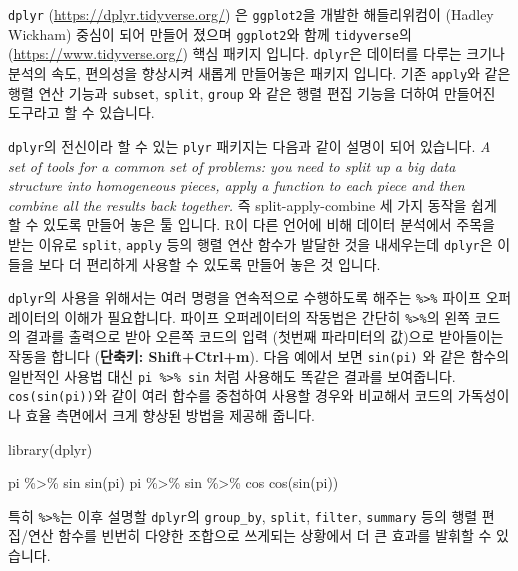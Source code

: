 \documentclass[
]{book}
\newenvironment{Shaded}{\begin{snugshade}}{\end{snugshade}}
\newcommand{\FunctionTok}[1]{\textcolor[rgb]{0.00,0.00,0.00}{#1}}
\newcommand{\NormalTok}[1]{#1}
\newcommand{\SpecialCharTok}[1]{\textcolor[rgb]{0.00,0.00,0.00}{#1}}
\begin{document}
\texttt{dplyr} (\url{https://dplyr.tidyverse.org/}) 은 \texttt{ggplot2}을 개발한 해들리위컴이 (Hadley Wickham) 중심이 되어 만들어 졌으며 \texttt{ggplot2}와 함께 \texttt{tidyverse}의 (\url{https://www.tidyverse.org/}) 핵심 패키지 입니다. \texttt{dplyr}은 데이터를 다루는 크기나 분석의 속도, 편의성을 향상시켜 새롭게 만들어놓은 패키지 입니다. 기존 \texttt{apply}와 같은 행렬 연산 기능과 \texttt{subset}, \texttt{split}, \texttt{group} 와 같은 행렬 편집 기능을 더하여 만들어진 도구라고 할 수 있습니다.

\texttt{dplyr}의 전신이라 할 수 있는 \texttt{plyr} 패키지는 다음과 같이 설명이 되어 있습니다. \emph{A set of tools for a common set of problems: you need to split up a big data structure into homogeneous pieces, apply a function to each piece and then combine all the results back together.} 즉 split-apply-combine 세 가지 동작을 쉽게 할 수 있도록 만들어 놓은 툴 입니다. R이 다른 언어에 비해 데이터 분석에서 주목을 받는 이유로 \texttt{split}, \texttt{apply} 등의 행렬 연산 함수가 발달한 것을 내세우는데 \texttt{dplyr}은 이들을 보다 더 편리하게 사용할 수 있도록 만들어 놓은 것 입니다.

\texttt{dplyr}의 사용을 위해서는 여러 명령을 연속적으로 수행하도록 해주는 \texttt{\%\textgreater{}\%} 파이프 오퍼레이터의 이해가 필요합니다. 파이프 오퍼레이터의 작동법은 간단히 \texttt{\%\textgreater{}\%}의 왼쪽 코드의 결과를 출력으로 받아 오른쪽 코드의 입력 (첫번째 파라미터의 값)으로 받아들이는 작동을 합니다 (\textbf{단축키: Shift+Ctrl+m}). 다음 예에서 보면 \texttt{sin(pi)} 와 같은 함수의 일반적인 사용법 대신 \texttt{pi\ \%\textgreater{}\%\ sin} 처럼 사용해도 똑같은 결과를 보여줍니다. \texttt{cos(sin(pi))}와 같이 여러 합수를 중첩하여 사용할 경우와 비교해서 코드의 가독성이나 효율 측면에서 크게 향상된 방법을 제공해 줍니다.

\begin{Shaded}
\begin{Highlighting}[]
\FunctionTok{library}\NormalTok{(dplyr)}

\NormalTok{pi }\SpecialCharTok{\%\textgreater{}\%}\NormalTok{ sin}
\FunctionTok{sin}\NormalTok{(pi)}
\NormalTok{pi }\SpecialCharTok{\%\textgreater{}\%}\NormalTok{ sin }\SpecialCharTok{\%\textgreater{}\%}\NormalTok{ cos}
\FunctionTok{cos}\NormalTok{(}\FunctionTok{sin}\NormalTok{(pi))}
\end{Highlighting}
\end{Shaded}

특히 \texttt{\%\textgreater{}\%}는 이후 설명할 \texttt{dplyr}의 \texttt{group\_by}, \texttt{split}, \texttt{filter}, \texttt{summary} 등의 행렬 편집/연산 함수를 빈번히 다양한 조합으로 쓰게되는 상황에서 더 큰 효과를 발휘할 수 있습니다.
\end{document}
